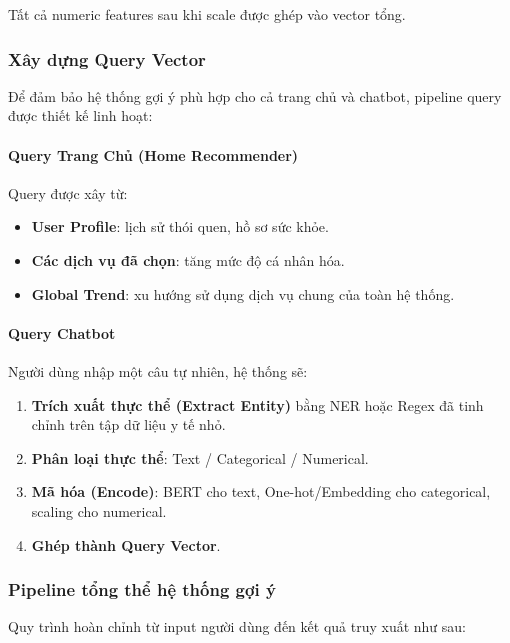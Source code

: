 Tất cả numeric features sau khi scale được ghép vào vector tổng.

\subsubsection{Xây dựng Query Vector}

Để đảm bảo hệ thống gợi ý phù hợp cho cả trang chủ và chatbot, pipeline query được thiết kế linh hoạt:

\paragraph{Query Trang Chủ (Home Recommender)}
Query được xây từ:
\begin{itemize}
    \item \textbf{User Profile}: lịch sử thói quen, hồ sơ sức khỏe.
    \item \textbf{Các dịch vụ đã chọn}: tăng mức độ cá nhân hóa.
    \item \textbf{Global Trend}: xu hướng sử dụng dịch vụ chung của toàn hệ thống.
\end{itemize}

\paragraph{Query Chatbot}
Người dùng nhập một câu tự nhiên, hệ thống sẽ:
\begin{enumerate}
    \item \textbf{Trích xuất thực thể (Extract Entity)} bằng NER hoặc Regex đã tinh chỉnh trên tập dữ liệu y tế nhỏ.
    \item \textbf{Phân loại thực thể}: Text / Categorical / Numerical.
    \item \textbf{Mã hóa (Encode)}: BERT cho text, One-hot/Embedding cho categorical, scaling cho numerical.
    \item \textbf{Ghép thành Query Vector}.
\end{enumerate}

\subsubsection{Pipeline tổng thể hệ thống gợi ý}

Quy trình hoàn chỉnh từ input người dùng đến kết quả truy xuất như sau:

